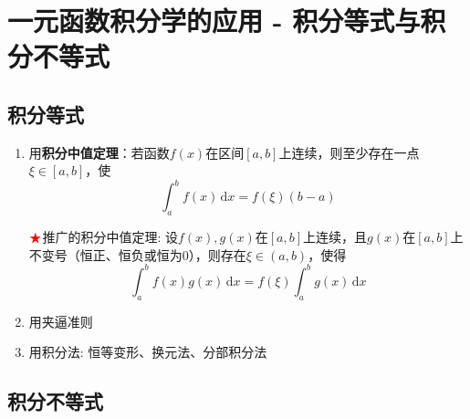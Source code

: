 \documentclass[../book.tex]{subfiles}
\begin{document}
    \section{一元函数积分学的应用 - 积分等式与积分不等式}

    \subsection{积分等式}

    \begin{enumerate}
        \item 用\textbf{积分中值定理}：若函数$f(x)$在区间$[a, b]$上连续，则至少存在一点$\xi \in [a, b]$，使
        \[
            \int_a^b f(x)\,\mathrm{d}x = f(\xi)(b - a)
        \]

        $\color{red}{\bigstar}$推广的积分中值定理: 设$f(x), g(x)$在$[a, b]$上连续，且$g(x)$在$[a, b]$上不变号（恒正、恒负或恒为0），则存在$\xi \in (a, b)$，使得
        \[
            \int_a^b f(x)g(x)\,\mathrm{d}x = f(\xi)\int_a^b g(x)\,\mathrm{d}x
        \]
        \item 用夹逼准则
        \item 用积分法: 恒等变形、换元法、分部积分法
    \end{enumerate}

    \subsection{积分不等式}
\end{document}
